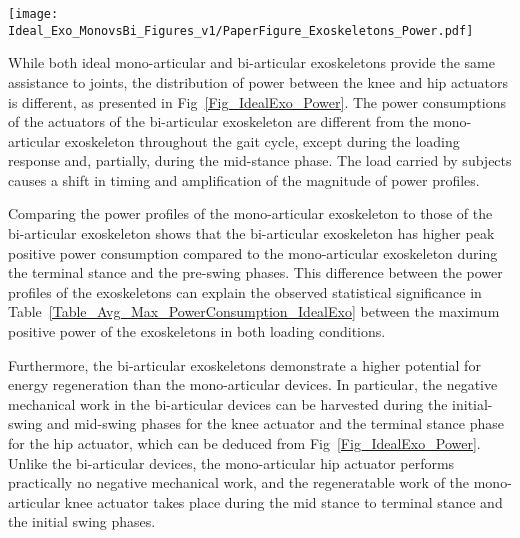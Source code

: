 \documentclass[10pt,letterpaper]{article}
\begin{document}
\begin{figure*}[ht]
	\centering
	\texttt{[image: Ideal\_Exo\_MonovsBi\_Figures\_v1/PaperFigure\_Exoskeletons\_Power.pdf]}
	\vspace{-3mm}
	\caption{{\small\textbf{Power profiles of exoskeletons and corresponding net power at the joint.} The power profiles of exoskeletons for subjects under \emph{noload} (blue) and \emph{loaded}(dark blue) walking conditions, and the net joint power profiles for \textit{noload} (green) and \textit{loaded} (black) conditions are shown for each actuator of the exoskeletons. The curves are averaged over simulations of 7 subjects with 3 trials and normalized by the subject mass; shaded regions around the mean profiles indicate the standard deviations.}}
	\label{Fig_IdealExo_Power}
\end{figure*}%

While both ideal mono-articular and bi-articular exoskeletons provide the same assistance to joints, the distribution of power between the knee and hip actuators is different, as presented in Fig~\ref{Fig_IdealExo_Power}. The power consumptions of the actuators of the bi-articular exoskeleton are different from the mono-articular exoskeleton throughout the gait cycle, except during the loading response and, partially, during the mid-stance phase. The load carried by subjects causes a shift in timing and  amplification of the magnitude of power profiles.

Comparing the power profiles of the mono-articular exoskeleton to those of the bi-articular exoskeleton shows that the bi-articular exoskeleton has higher peak positive power consumption compared to the mono-articular exoskeleton during the terminal stance and the pre-swing phases. This difference between the power profiles of the exoskeletons can explain the observed statistical significance in Table~\ref{Table_Avg_Max_PowerConsumption_IdealExo} between the maximum positive power of the exoskeletons in both loading conditions.

Furthermore, the bi-articular exoskeletons demonstrate a higher potential for energy regeneration than the mono-articular devices. In particular,  the negative mechanical work in the bi-articular devices can be harvested during the initial-swing and mid-swing phases for the knee actuator and the terminal stance phase for the hip actuator, which can be deduced from Fig~\ref{Fig_IdealExo_Power}. Unlike the bi-articular devices, the mono-articular hip actuator performs practically no negative mechanical work, and the regeneratable work of the mono-articular knee actuator takes place during the mid stance to terminal stance and the initial swing phases.
\end{document}
